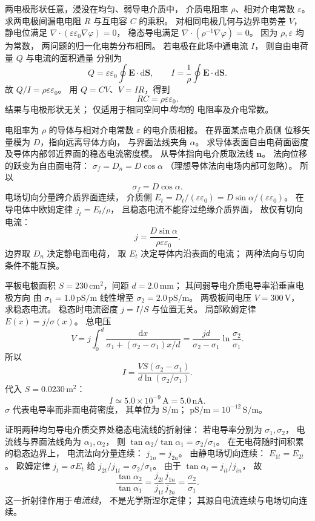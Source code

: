 两电极形状任意，浸没在均匀、弱导电介质中，
介质电阻率 $\rho$、相对介电常数 $\varepsilon$。
求两电极间漏电电阻 $R$ 与互电容 $C$ 的乘积。
\exsolution
对相同电极几何与边界电势差 $V$，
静电位满足 $\nabla\cdot(\varepsilon\varepsilon_0
\nabla\varphi)=0$，
稳态导电满足
$\nabla\cdot(\rho^{-1}\nabla\varphi)=0$。
因为 $\rho,\varepsilon$ 均为常数，
两问题的归一化电势分布相同。
若电极在此场中通电流 $I$，
则自由电荷量 $Q$ 与电流的面积通量
分别为
\[
Q=\varepsilon\varepsilon_0\oint\bm E\cdot\mathrm d\bm S,
\qquad
I=\frac1\rho\oint\bm E\cdot\mathrm d\bm S.
\]
故 $Q/I=\rho\varepsilon\varepsilon_0$。
用 $Q=CV$、$V=IR$，得到
\[
\boxed{RC=\rho\varepsilon\varepsilon_0}.
\]
\excheck 结果与电极形状无关；
仅适用于相同空间中\emph{均匀}的
电阻率及介电常数。

电阻率为 $\rho$ 的导体与相对介电常数
$\varepsilon$ 的电介质相接。
在界面某点电介质侧
位移矢量模为 $D$，指向远离导体方向，
与界面法线夹角 $\alpha$。
求导体表面自由电荷面密度
及导体内部邻近界面的稳态电流密度模。
\exsolution
从导体指向电介质取法线 $\bm n$。
法向位移的跃变为自由面电荷：
$\sigma_f=D_n=D\cos\alpha$
（理想导体法向电场内部可忽略）。
所以
\[
\boxed{\sigma_f=D\cos\alpha}.
\]
电场切向分量跨介质界面连续，
介质侧
$E_t=D_t/(\varepsilon\varepsilon_0)
=D\sin\alpha/(\varepsilon\varepsilon_0)$。
在导电体中欧姆定律
$j_t=E_t/\rho$，
且稳态电流不能穿过绝缘介质界面，
故仅有切向电流：
\[
\boxed{j=\frac{D\sin\alpha}
{\rho\varepsilon\varepsilon_0}}.
\]
\excheck 边界取 $D_n$ 决定静电面电荷，
取 $E_t$ 决定导体内沿表面的电流；
两种法向与切向条件不能互换。

平板电极面积
$S=230\,\mathrm{cm^2}$，间距
$d=2.0\,\mathrm{mm}$；
其间弱导电介质电导率沿垂直电极方向
由 $\sigma_1=1.0\,\mathrm{pS/m}$
线性增至 $\sigma_2=2.0\,\mathrm{pS/m}$。
两极板间电压 $V=300\,\mathrm V$，
求稳态电流。
\exsolution
稳态时电流密度
$j=I/S$ 与位置无关。
局部欧姆定律
$E(x)=j/\sigma(x)$。
总电压
\[
V=j\int_0^d\frac{\mathrm dx}{\sigma_1+
(\sigma_2-\sigma_1)x/d}
=\frac{jd}{\sigma_2-\sigma_1}
\ln\frac{\sigma_2}{\sigma_1}.
\]
所以
\[
\boxed{I=\frac{VS(\sigma_2-\sigma_1)}
{d\ln(\sigma_2/\sigma_1)}}.
\]
代入 $S=0.0230\,\mathrm{m^2}$：
\[
\boxed{I\simeq5.0\times10^{-9}\,\mathrm A
=5.0\,\mathrm{nA}}.
\]
\excheck $\sigma$ 代表电导率而非面电荷密度，
其单位为 $\mathrm{S/m}$；
$\mathrm{pS/m}=10^{-12}\,\mathrm{S/m}$。

证明两种均匀导电介质交界处稳态电流线的折射律：
若电导率分别为 $\sigma_1,\sigma_2$，
电流线与界面法线角为 $\alpha_1,\alpha_2$，
则
$\tan\alpha_2/\tan\alpha_1=\sigma_2/\sigma_1$。
\exsolution
在无电荷随时间积累的稳态边界上，
电流法向分量连续：
$j_{1n}=j_{2n}$。
由静电场切向连续：
$E_{1t}=E_{2t}$。
欧姆定律 $j_t=\sigma E_t$ 给
$j_{2t}/j_{1t}=\sigma_2/\sigma_1$。
由于
$\tan\alpha_i=j_{it}/j_{in}$，
故
\[
\frac{\tan\alpha_2}{\tan\alpha_1}
=\frac{j_{2t}}{j_{1t}}
\frac{j_{1n}}{j_{2n}}
=\boxed{\frac{\sigma_2}{\sigma_1}}.
\]
\excheck 这一折射律作用于\emph{电流线}，
不是光学斯涅尔定律；
其源自电流连续与电场切向连续。

